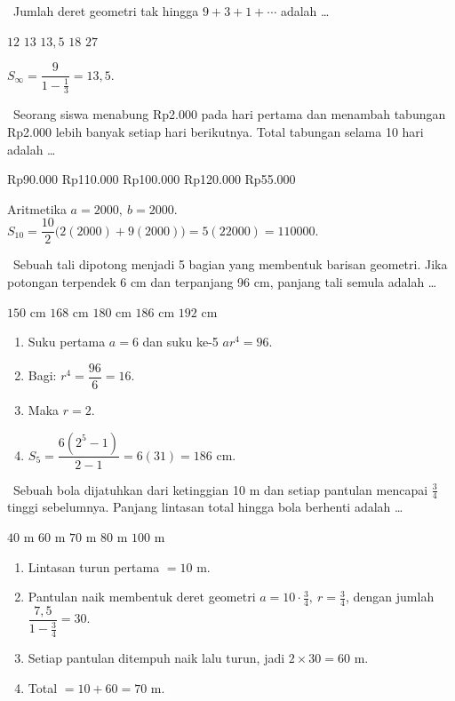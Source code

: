 \documentclass[11pt,a4paper]{exam}
\newenvironment{langkah}{%
  \begin{enumerate}[label=\textbf{Langkah \arabic*:},leftmargin=2.6em,
    itemsep=2pt,topsep=2pt]}{\end{enumerate}}
\newcommand{\Inter}{{\footnotesize\textsf{\textcolor{biru}{[Intermediate]}}}\ }
\newcommand{\Adv}{{\footnotesize\textsf{\textcolor{oranye}{[Advanced]}}}\ }
\begin{document}
\begin{questions}
\question \Inter Jumlah deret geometri tak hingga $9 + 3 + 1 + \cdots$ adalah \dots
\begin{choices}
\choice $12$ \choice $13$ \CorrectChoice $13{,}5$ \choice $18$ \choice $27$
\end{choices}
\begin{solution}$S_\infty = \dfrac{9}{1-\frac13} = 13{,}5.$\end{solution}

\question \Inter Seorang siswa menabung Rp2.000 pada hari pertama dan menambah
tabungan Rp2.000 lebih banyak setiap hari berikutnya. Total tabungan selama
10 hari adalah \dots
\begin{choices}
\choice Rp90.000 \CorrectChoice Rp110.000 \choice Rp100.000
\choice Rp120.000 \choice Rp55.000
\end{choices}
\begin{solution}Aritmetika $a=2000,\ b=2000$.
$S_{10} = \dfrac{10}{2}\big(2(2000)+9(2000)\big) = 5(22000) = 110000.$\end{solution}

\question \Adv Sebuah tali dipotong menjadi 5 bagian yang membentuk barisan
geometri. Jika potongan terpendek 6 cm dan terpanjang 96 cm, panjang tali
semula adalah \dots
\begin{choices}
\choice $150$ cm \choice $168$ cm \choice $180$ cm \CorrectChoice $186$ cm \choice $192$ cm
\end{choices}
\begin{solution}
\begin{langkah}
\item Suku pertama $a=6$ dan suku ke-5 $ar^{4}=96$.
\item Bagi: $r^{4} = \dfrac{96}{6} = 16$.
\item Maka $r = 2$.
\item $S_5 = \dfrac{6(2^{5}-1)}{2-1} = 6(31) = 186$ cm.
\end{langkah}
\end{solution}

\question \Adv Sebuah bola dijatuhkan dari ketinggian 10 m dan setiap pantulan
mencapai $\tfrac{3}{4}$ tinggi sebelumnya. Panjang lintasan total hingga bola
berhenti adalah \dots
\begin{choices}
\choice $40$ m \choice $60$ m \CorrectChoice $70$ m \choice $80$ m \choice $100$ m
\end{choices}
\begin{solution}
\begin{langkah}
\item Lintasan turun pertama $=10$ m.
\item Pantulan naik membentuk deret geometri $a=10\cdot\tfrac34,\ r=\tfrac34$, dengan jumlah $\dfrac{7{,}5}{1-\frac34}=30$.
\item Setiap pantulan ditempuh naik lalu turun, jadi $2\times 30 = 60$ m.
\item Total $= 10 + 60 = 70$ m.
\end{langkah}
\end{solution}


\end{questions}
\end{document}

